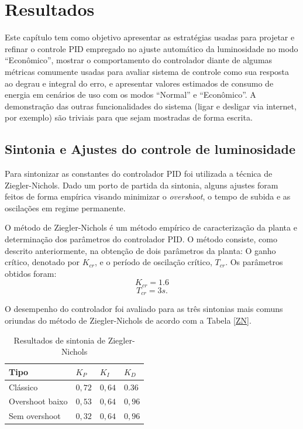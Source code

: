 \chapter{Resultados}

Este capítulo tem como objetivo apresentar as estratégias usadas para projetar e refinar o controle PID empregado no ajuste automático da luminosidade no modo ``Econômico'', mostrar o comportamento do controlador diante de algumas métricas comumente usadas para avaliar sistema de controle como sua resposta ao degrau e integral do erro, e apresentar valores estimados de consumo de energia em cenários de uso com os modos ``Normal'' e ``Econômico''. 
A demonstração das outras funcionalidades do sistema (ligar e desligar via internet, por exemplo) são triviais para que sejam mostradas de forma escrita.

\section{Sintonia e Ajustes do controle de luminosidade}

Para sintonizar as constantes do controlador PID foi utilizada a técnica de Ziegler-Nichols. Dado um porto de partida da sintonia, alguns ajustes foram feitos de forma empírica visando minimizar o \textit{overshoot}, o tempo de subida e as oscilações em regime permanente.

O método de Ziegler-Nichols é um método empírico de caracterização da planta e determinação dos parâmetros do controlador PID. O método consiste, como descrito anteriormente, na obtenção de dois parâmetros da planta: O ganho crítico, denotado por $K_{cr}$, e o período de oscilação crítico, $T_{cr}$. Os parâmetros obtidos foram:
\begin{equation}
    \label{eq:rs1}
    K_{cr} = 1.6
\end{equation}
\begin{equation}
    \label{eq:rs1.1}
    T_{cr} = 3 s.
\end{equation}

O desempenho do controlador foi avaliado para as três sintonias mais comuns oriundas do método de Ziegler-Nichols de acordo  com a Tabela \ref{ZN}.

\begin{table}[htb]
    \centering
    \caption{Resultados de sintonia de Ziegler-Nichols}
    \label{ZNvalores}
    \begin{tabular}{llll}
    \hline
    Tipo            & $K_P$ & $K_I$ & $K_D$ \\ 
    \hline \hline
    Clássico        & $0,72$ & $0,64$ & $0.36$ \\ 
    \hline
    Overshoot baixo & $0,53$ & $0,64$ & $0,96$ \\ 
    \hline
    Sem overshoot   & $0,32$ & $0,64$ & $0,96$ \\
    \hline
    \end{tabular}
\end{table}

